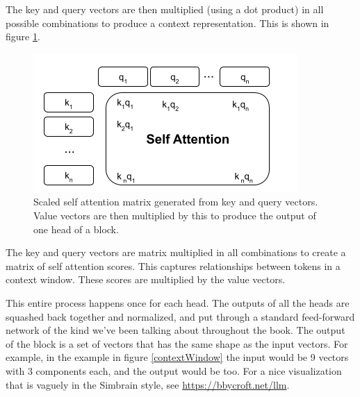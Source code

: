 The key and query vectors are then multiplied (using a dot product) in all possible combinations to produce a context representation.  This is shown in figure \ref{selfAttention}.

\begin{figure}[h]
\centering
\includegraphics[scale=.6]{./images/selfAttention.png}
\caption[Jeff Yoshimi with consultation from Tim Meyer.]{Scaled self attention matrix generated from key and query vectors. Value vectors are then multiplied by this to produce the output of one head of a block. }
\label{selfAttention}
\end{figure}

The key and query vectors are matrix multiplied in all combinations to create a matrix of self attention scores. This captures relationships between tokens in a context window. These scores are multiplied by the value vectors. 

This entire process happens once for each head. The outputs of all the heads are squashed back together and normalized, and put through a standard feed-forward network of the kind we've been talking about throughout the book. The output of the block is a set of vectors that has the same shape as the input vectors.  For example, in the example in figure \ref{contextWindow} the input would be 9 vectors with 3 components each, and the output would be too. For a nice visualization that is vaguely in the Simbrain style, see \url{https://bbycroft.net/llm}.


